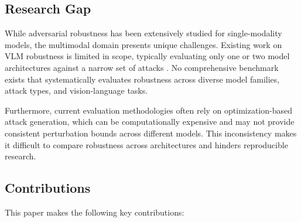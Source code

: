 \subsection{Research Gap}

While adversarial robustness has been extensively studied for single-modality models, the multimodal domain presents unique challenges. Existing work on VLM robustness is limited in scope, typically evaluating only one or two model architectures against a narrow set of attacks \cite{zhang2023multimodal, zhao2024adversarial}. No comprehensive benchmark exists that systematically evaluates robustness across diverse model families, attack types, and vision-language tasks.

Furthermore, current evaluation methodologies often rely on optimization-based attack generation, which can be computationally expensive and may not provide consistent perturbation bounds across different models. This inconsistency makes it difficult to compare robustness across architectures and hinders reproducible research.

\subsection{Contributions}

This paper makes the following key contributions:

